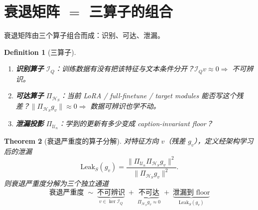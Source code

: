 \documentclass[11pt,a4paper]{article}
\newtheorem{theorem}{Theorem}[section]
\newtheorem{definition}[theorem]{Definition}
\newcommand{\cH}{\mathcal{H}}
\newcommand{\cI}{\mathcal{I}}
\newcommand{\cU}{\mathcal{U}}
\newcommand{\ProjectOp}{\Pi}
\begin{document}
\section{衰退矩阵 $=$ 三算子的组合}
\label{sec:decay_operators}

衰退矩阵由三个算子组合而成：识别、可达、泄漏。

\begin{definition}[三算子]
\begin{enumerate}[label=(\roman*),nosep]
\item \textbf{识别算子} $\cI_Q$：训练数据有没有把该特征与文本条件分开？$\cI_Q v\approx 0\Rightarrow$ 不可辨识。
\item \textbf{可达算子} $\ProjectOp_{\cH_S}$：当前 LoRA / full-finetune / target modules 能否写这个残差？$\|\ProjectOp_{\cH_S}g_v\|\approx 0\Rightarrow$ 数据可辨识也学不动。
\item \textbf{泄漏投影} $\ProjectOp_{\cU_n}$：学到的更新有多少变成 caption-invariant floor？
\end{enumerate}
\end{definition}

\begin{theorem}[衰退严重度的算子分解]\label{thm:decay_decomp}
对特征方向 $v$（残差 $g_v$），定义经架构学习后的泄漏
\begin{equation}\label{eq:leak_v}
\mathrm{Leak}_S(g_v) = \frac{\|\ProjectOp_{\cU_n}\ProjectOp_{\cH_S}g_v\|^2}{\|\ProjectOp_{\cH_S}g_v\|^2}.
\end{equation}
则衰退严重度分解为三个独立通道
\begin{equation}\label{eq:decay_master}
\boxed{
\text{衰退严重度} \;\sim\; \underbrace{\text{不可辨识}}_{v\in\ker\cI_Q} \;+\; \underbrace{\text{不可达}}_{\ProjectOp_{\cH_S}g_v\approx 0} \;+\; \underbrace{\text{泄漏到 floor}}_{\mathrm{Leak}_S(g_v)}
}
\end{equation}
\end{theorem}
\end{document}
